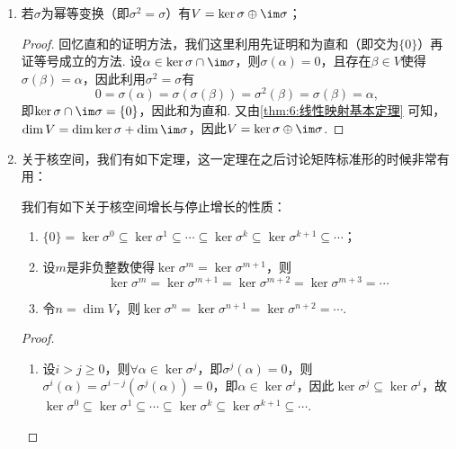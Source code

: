 \begin{enumerate}
    \item \label{item:6:像与核的进一步讨论:1}
          若$\sigma$为幂等变换（即$\sigma^2=\sigma$）有$V=\ker\sigma\oplus\im \sigma$；

          \begin{proof}
              回忆直和的证明方法，我们这里利用先证明和为直和（即交为$\{0\}$）再证等号成立的方法. 设$\alpha\in\ker\sigma\cap\im \sigma$，则$\sigma(\alpha)=0$，且存在$\beta\in V$使得$\sigma(\beta)=\alpha$，因此利用$\sigma^2=\sigma$有
              \[0=\sigma(\alpha)=\sigma(\sigma(\beta))=\sigma^2(\beta)=\sigma(\beta)=\alpha,\]
              即$\ker\sigma\cap\im \sigma=\{0\}$，因此和为直和. 又由\autoref{thm:6:线性映射基本定理} 可知，$\dim V=\dim\ker\sigma+\dim\im \sigma$，因此$V=\ker\sigma\oplus\im \sigma$.
          \end{proof}

    \item 关于核空间，我们有如下定理，这一定理在之后讨论矩阵标准形的时候非常有用：
          \begin{theorem} \label{thm:6:核空间性质}
              我们有如下关于核空间增长与停止增长的性质：
              \begin{enumerate}
                  \item $\{0\}=\ker \sigma^0\subseteq\ker \sigma^1\subseteq\cdots\subseteq \ker \sigma^k\subseteq\ker \sigma^{k+1}\subseteq\cdots$；

                  \item 设$m$是非负整数使得$\ker \sigma^m=\ker \sigma^{m+1}$，则
                        \[\ker \sigma^m=\ker \sigma^{m+1}=\ker \sigma^{m+2}=\ker \sigma^{m+3}=\cdots\]

                  \item 令$n=\dim V$，则$\ker \sigma^n=\ker \sigma^{n+1}=\ker \sigma^{n+2}=\cdots$.
              \end{enumerate}
          \end{theorem}

          \begin{proof}
              \begin{enumerate}
                  \item 设$i>j\geqslant 0$，则$\forall\alpha\in\ker\sigma^j$，即$\sigma^j(\alpha)=0$，则$\sigma^i(\alpha)=\sigma^{i-j}(\sigma^j(\alpha))=0$，即$\alpha\in\ker\sigma^i$，因此$\ker\sigma^j\subseteq\ker\sigma^i$，故$\ker \sigma^0\subseteq\ker \sigma^1\subseteq\cdots\subseteq \ker \sigma^k\subseteq\ker \sigma^{k+1}\subseteq\cdots$.


\end{enumerate}
\end{proof}
\end{enumerate}
